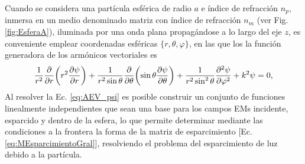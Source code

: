 Cuando se considera una partícula esférica de radio $a$ e índice de refracción $n_p$, inmersa en un medio denominado matriz con índice de refracción $n_m$ (ver Fig. \ref{fig:EsferaA}), iluminada por una onda plana propagándose a lo largo del eje $z$, es conveniente emplear coordenadas esféricas $\{ r, \theta, \varphi\}$, en las que los la función generadora de los armónicos vectoriales es 
	\begin{align}
	\frac{1}{r^2} \pdv{r}\qty(r^2\pdv{\psi}{r})+ 
	\frac{1}{r^2\sin\theta}\pdv{\theta}\qty(\sin\theta\pdv{\psi}{\theta})
	 + \frac{1}{r^2\sin^2\theta}\pdv[2]{\psi}{\varphi} + k^2 \psi =0, \label{eq:AEV_psi}
	\end{align}
Al resolver la Ec. \eqref{eq:AEV_psi} es posible construir un conjunto de funciones linealmente independientes que sean una base para los campos EMs incidente, esparcido y dentro de la esfera, lo que permite determinar mediante las condiciones a la frontera la forma de la matriz de esparcimiento [Ec. \eqref{eq:MEsparcimientoGral}], resolviendo el problema del esparcimiento de luz debido a la partícula.

